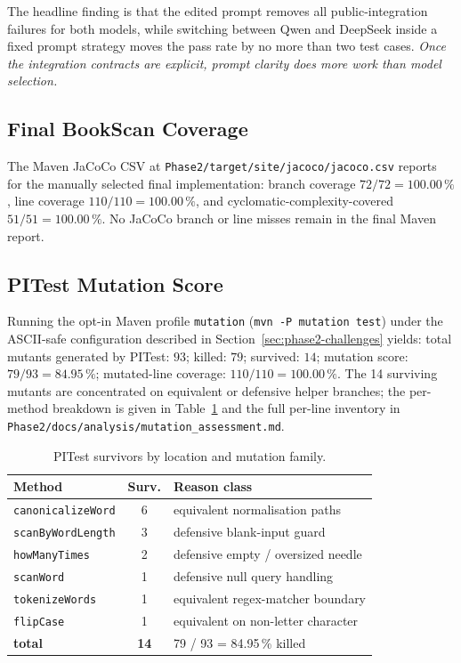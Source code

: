 \documentclass[journal]{IEEEtran}
\begin{document}
The headline finding is that the edited prompt removes all
public-integration failures for both models, while switching between
Qwen and DeepSeek inside a fixed prompt strategy moves the pass rate by
no more than two test cases. \emph{Once the integration contracts are
explicit, prompt clarity does more work than model selection.}

\subsection{Final BookScan Coverage}

The Maven JaCoCo CSV at \texttt{Phase2/target/site/jacoco/jacoco.csv}
reports for the manually selected final implementation: branch coverage
$72/72=100.00\,\%$, line coverage $110/110=100.00\,\%$, and
cyclomatic-complexity-covered $51/51=100.00\,\%$. No JaCoCo branch or
line misses remain in the final Maven report.

\subsection{PITest Mutation Score}

Running the opt-in Maven profile \texttt{mutation}
(\texttt{mvn -P mutation test}) under the ASCII-safe configuration
described in Section~\ref{sec:phase2-challenges} yields:
total mutants generated by PITest: $93$;
killed: $79$; survived: $14$; mutation score: $79/93=84.95\,\%$;
mutated-line coverage: $110/110=100.00\,\%$. The 14 surviving mutants are
concentrated on equivalent or defensive helper branches; the per-method
breakdown is given in Table~\ref{tab:pit-survivors} and the full per-line
inventory in \texttt{Phase2/docs/analysis/mutation\_assessment.md}.

\begin{table}[!t]
\renewcommand{\arraystretch}{1.15}
\caption{PITest survivors by location and mutation family.}
\label{tab:pit-survivors}
\centering
\footnotesize
\begin{tabular}{@{}lcp{4.0cm}@{}}
\toprule
\textbf{Method} & \textbf{Surv.} & \textbf{Reason class} \\
\midrule
\texttt{canonicalizeWord}    & 6 & equivalent normalisation paths \\
\texttt{scanByWordLength}    & 3 & defensive blank-input guard \\
\texttt{howManyTimes}        & 2 & defensive empty / oversized needle \\
\texttt{scanWord}            & 1 & defensive null query handling \\
\texttt{tokenizeWords}       & 1 & equivalent regex-matcher boundary \\
\texttt{flipCase}            & 1 & equivalent on non-letter character \\
\midrule
\textbf{total}               & \textbf{14} & 79 / 93 = 84.95\,\% killed \\
\bottomrule
\end{tabular}
\end{table}
\end{document}
